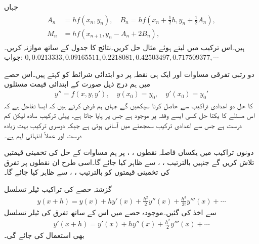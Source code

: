 جہاں
\begin{gather}
\begin{aligned}
A_n&=hf(x_n,y_n),\quad B_n=hf(x_n+\tfrac{1}{2}h,y_n+\tfrac{1}{2}A_n),\\
M_n&=hf(x_{n+1},y_n-A_n+2B_n),
\end{aligned}
\end{gather}
ہیں۔اس ترکیب میں  لیتے ہوئے مثال  حل کریں۔نتائج کا جدول  کے ساتھ موازنہ کریں۔\\
جواب:\quad
$0,0.0213333,0.09165511,0.2218081,0.42503497,0.717509377,\cdots$

دو رتبی تفرقی مساوات اور  ایک ہی نقطہ پر دو ابتدائی شرائط کو   کہتے ہیں۔اس حصے میں ہم درج ذیل صورت کے ابتدائی قیمت مسئلوں 
\begin{align}\label{مساوات_اعدادی_دو_درجی-ابتدائی_قیمت_الف}
y''=f(x,y,y'),\quad y(x_0)=y_0,\quad y'(x_0)=y_0'
\end{align} 
کا حل دو اعدادی تراکیب سے حاصل کرنا سیکھیں گے جہاں ہم فرض کرتے ہیں کہ  ایسا تفاعل ہے کہ اس مسئلے کا یکتا حل کسی ایسے وقفہ پر  موجود ہے جس پر  پایا جاتا ہے۔ پہلی ترکیب سادہ لیکن کم درست ہے جس سے اعدادی ترکیب سمجھنے میں آسانی ہوتی ہے  جبکہ دوسری ترکیب بہت زیادہ درست اور عملاً انتہائی اہم ہے۔

دونوں تراکیب میں یکساں فاصلہ  نقطوں ، ،  پر  ہم مساوات  کے حل  کی تخمینی قیمتیں تلاش کریں گے جنہیں بالترتیب ، ،  سے ظاہر کیا جائے گا۔اسی طرح ان نقطوں پر تفرق  کی تخمینی قیمتوں کو بالترتیب ، ،  سے ظاہر کیا جائے گا۔

گزشتہ حصے کی تراکیب ٹیلر تسلسل
\begin{align}\label{مساوات_اعدادی_دو_درجی-ابتدائی_قیمت_ب}
y(x+h)=y(x)+hy'(x)+\tfrac{h^2}{2}y''(x)+\tfrac{h^3}{3!}y'''(x)+\cdots
\end{align}
سے اخذ کی گئیں۔موجودہ حصے میں اس کے ساتھ تفرق کی ٹیلر تسلسل
\begin{align}\label{مساوات_اعدادی_دو_درجی-ابتدائی_قیمت_پ}
y'(x+h)=y'(x)+hy''(x)+\tfrac{h^2}{2}y'''(x)+\cdots
\end{align}
بھی استعمال کی جائے گی۔

